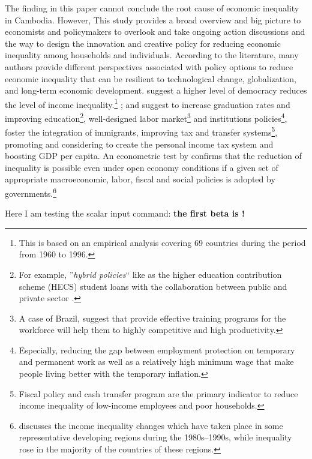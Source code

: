 \documentclass[11pt]{article}
\newcommand*{\TablesPath}{./tables/} %
\newcommand{\scalarinput}[1]{\DTLfetch{scalars}{thekey}{#1}{thevalue}}
\begin{document}
The finding in this paper cannot conclude the root cause of economic inequality in Cambodia. However, This study provides a broad overview and big picture to economists and policymakers to overlook and take ongoing action discussions and the way to design the innovation and creative policy for reducing economic inequality among households and individuals. According to the literature, many authors provide different perspectives associated with policy options to reduce economic inequality that can be resilient to technological change, globalization, and long-term economic development. \citet{Herran2005} suggest a higher level of democracy reduces the level of income inequality.\footnote{This is based on an empirical analysis covering 69 countries during the period from 1960 to 1996.} \citet{Bastagli2012, Breunig2019}; and \citet{Bastagli2012} suggest to increase graduation rates and improving education\footnote{For example, ''\textit{hybrid policies}`` like as the higher education contribution scheme (HECS) student loans with the collaboration between public and private sector \cite{Breunig2019}.}, well-designed labor market\footnote{A case of Brazil, \citet{Herran2005} suggest that provide effective training programs for the workforce will help them to highly competitive and high productivity.} and institutions policies\footnote{Especially, reducing the gap between employment protection on temporary and permanent work as well as a relatively high minimum wage that make people living better with the temporary inflation.}, foster the integration of immigrants, improving tax and transfer systems\footnote{Fiscal policy and cash transfer program are the primary indicator to reduce income inequality of low-income employees and poor households.}, promoting and considering to create the personal income tax system and boosting GDP per capita. An econometric test by \citet{GIZ2015} confirms that the reduction of inequality is possible even under open economy conditions if a given set of appropriate macroeconomic, labor, fiscal and social policies is adopted by governments.\footnote{\citet{GIZ2015} discusses the income inequality changes which have taken place in some representative developing regions during the 1980s--1990s, while inequality rose in the majority of the countries of these regions.}

Here I am testing the scalar input command: \textbf{the first beta is \scalarinput{first.value.beta}!}

\blindtext[2]


\end{document}
